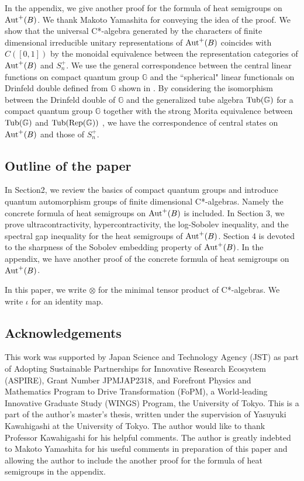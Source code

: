 \documentclass[12pt]{amsart}
\theoremstyle{plain} %
\theoremstyle{definition}
\theoremstyle{remark}
\begin{document}
In the appendix, we give another proof for the formula of heat semigroups on ${\rm Aut}^+(B)$. We thank Makoto Yamashita for conveying the idea of the proof. We show that the universal C*-algebra generated by the characters of finite dimensional irreducible unitary representations of ${\rm Aut}^+(B)$ coincides with $C([0, 1])$ by the monoidal equivalence between the representation categories of ${\rm Aut}^+(B)$ and $S_n^+$. We use the general correspondence between the central linear functions on compact quantum group $\mathbb{G}$ and the ``spherical" linear functionals on  Drinfeld double defined from $\mathbb{G}$ shown in \cite{DCFY}. 
By considering the isomorphism between the Drinfeld double of $\mathbb{G}$ and the generalized tube algebra ${\rm Tub}(\mathbb{G})$ for a compact quantum group $\mathbb{G}$ together with the strong Morita equivalence between ${\rm Tub}(\mathbb{G})$ and ${\rm Tub}({\rm Rep}(\mathbb{G}))$ \cite{NY18}, we have the correspondence of central states on ${\rm Aut}^+(B)$ and those of $S_n^+$.


\subsection*{Outline of the paper}

In Section2, we review the basics of compact quantum groups and introduce quantum automorphism groups of finite dimensional C*-algebras. 
Namely the concrete formula of heat semigroups on ${\rm Aut}^+(B)$ is included. 
In Section 3, we prove ultracontractivity, hypercontractivity, the log-Sobolev inequality, and the spectral gap inequality for the heat semigroups of ${\rm Aut}^+(B)$. 
Section 4 is devoted to the sharpness of the Sobolev embedding property of ${\rm Aut}^+(B)$. 
In the appendix, we have another proof of the concrete formula of heat semigroups on ${\rm Aut}^+(B)$.

In this paper, we write $\otimes$ for the minimal tensor product of C*-algebras. We write $\iota$ for an identity map.

\subsection*{Acknowledgements}
 
This work was supported by Japan Science and Technology Agency (JST) as part of Adopting Sustainable Partnerships for Innovative Research Ecosystem (ASPIRE), Grant Number JPMJAP2318, and Forefront Physics and Mathematics Program to Drive Transformation (FoPM), a World-leading Innovative Graduate Study (WINGS) Program, the University of Tokyo.
This is a part of the author's master's thesis, written under the supervision of Yasuyuki Kawahigashi at the University of Tokyo. The author would like to thank Professor Kawahigashi for his helpful comments. 
The author is greatly indebted to Makoto Yamashita for his useful comments in preparation of this paper and allowing the author to include the another proof for the formula of heat semigroups in the appendix. 
\end{document}
